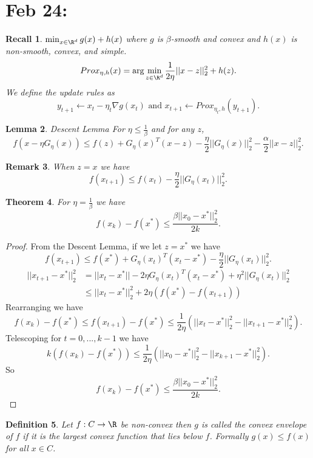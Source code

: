 \documentclass[a4paper]{article}
\newtheorem{thm}{Theorem}[section]
\newtheorem{lem}[thm]{Lemma}
\newtheorem{defn}[thm]{Definition}
\newtheorem{rmk}[thm]{Remark}
\newtheorem{rec}[thm]{Recall}
\begin{document}
\section{Feb 24:}
\begin{rec}
    $\min_{x\in \R^d} g(x)+h(x)$ where $g$ is $\beta$-smooth and convex and $h(x)$ is non-smooth, convex, and simple. \\
    \[
        Prox_{\eta,h}(x)=\arg\min_{z\in \R^d} \frac{1}{2\eta}||x-z||_2^2+h(z)
    .\]
    We define the update rules as 
    \[
    y_{t+1}\leftarrow x_t-\eta_t \nabla g(x_t) \text{ and } x_{t+1}\leftarrow Prox_{\eta_t,h}(y_{t+1})
    .\] 
\end{rec}
\begin{lem}
    Descent Lemma For $\eta\leq \frac{1}{\beta}$ and for any $z$, 
    \[
    f(x-\eta G_\eta(x))\leq f(z)+G_\eta(x)^T(x-z)-\frac{\eta}{2}||G_\eta(x)||_2^2-\frac{\alpha}{2}||x-z||_2^2
    .\] 
\end{lem}
\begin{rmk}
    When $z=x$ we have 
    \[
    f(x_{t+1})\leq f(x_t)- \frac{\eta}{2}||G_\eta(x_t)||_2^2
    .\] 
\end{rmk}
\begin{thm}
    For $\eta=\frac{1}{\beta}$ we have \[
    f(x_k)-f(x^*)\leq \frac{\beta ||x_0-x^*||_2^2}{2k}
    .\] 
\end{thm}
\begin{proof}
    From the Descent Lemma, if we let $z=x^*$ we have 
    \[
    f(x_{t+1})\leq f(x^*)+G_\eta(x_t)^T(x_t-x^*)-\frac{\eta}{2}||G_\eta(x_t)||_2^2
    .\] 
    \begin{align*}
        ||x_{t+1}-x^*||_2^2&=||x_t-x^*||-2\eta G_\eta (x_t)^T(x_t-x^*)+\eta^2 ||G_\eta (x_t)||_2^2\\
        &\leq ||x_t-x^*||_2^2+2\eta(f(x^*)-f(x_{t+1}))
    \end{align*}
    Rearranging we have 
    \[
    f(x_k)-f(x^*)\leq f(x_{t+1})-f(x^*)\leq \frac{1}{2\eta} \left( ||x_t-x^*||_2^2-||x_{t+1}-x^*||_2^2 \right)
    .\] 
    Telescoping for $t=0,...,k-1$ we have 
    \[
    k(f(x_k)-f(x^*))\leq \frac{1}{2\eta} \left( ||x_0-x^*||_2^2-||x_{k+1}-x^*||_2^2 \right)
    .\] 
    So \[
    f(x_k)-f(x^*)\leq \frac{\beta ||x_0-x^*||_2^2}{2k}
    .\] 
\end{proof}
\begin{defn}
    Let $f:C\to \R$ be non-convex then $g$ is called the convex envelope of $f$ if it is the largest convex function that lies below $f$. Formally $g(x)\leq f(x)$ for all $x\in C$. 
\end{defn}
\end{document}
